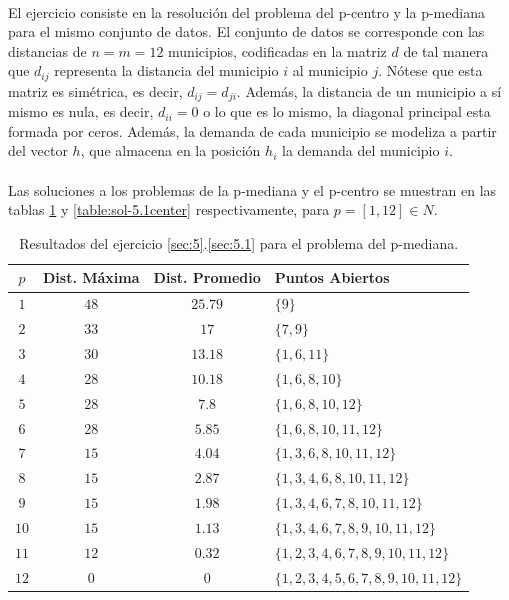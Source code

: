 \documentclass[spanish]{article}
\begin{document}
			\paragraph{}
			El ejercicio consiste en la resolución del problema del p-centro y la p-mediana para el mismo conjunto de datos. El conjunto de datos se corresponde con las distancias de $n = m = 12$ municipios, codificadas en la matriz $d$ de tal manera que $d_{ij}$ representa la distancia del municipio $i$ al municipio $j$. Nótese que esta matriz es simétrica, es decir, $d_{ij} = d_{ji}$. Además, la distancia de un municipio a sí mismo es nula, es decir, $d_{ii} = 0$ o lo que es lo mismo, la diagonal principal esta formada por ceros. Además, la demanda de cada municipio se modeliza a partir del vector $h$, que almacena en la posición $h_i$ la demanda del municipio $i$.

			\paragraph{}
			Las soluciones a los problemas de la p-mediana y el p-centro se muestran en las tablas \ref{table:sol-5.1median} y \ref{table:sol-5.1center} respectivamente, para $p = [1, 12] \in N$.

			\begin{table}[h]
				\begin{center}
					\begin{tabular}{|c || c || c || l | }
						\hline
						$p$		& Dist. Máxima 	& Dist. Promedio	& Puntos Abiertos	 \\ \hline \hline
						$1$ 	& $48$ 					& $25.79$					& $\{9\}$ \\ \hline
						$2$ 	& $33$ 					& $17$						& $\{7,9\}$ \\ \hline
						$3$ 	& $30$ 					& $13.18$					& $\{1,6,11\}$ \\ \hline
						$4$ 	& $28$ 					& $10.18$					& $\{1,6,8,10\}$ \\ \hline
						$5$ 	& $28$ 					& $7.8$						& $\{1,6,8,10,12\}$ \\ \hline
						$6$ 	& $28$ 					& $5.85$					& $\{1,6,8,10,11,12\}$ \\ \hline
						$7$ 	& $15$ 					& $4.04$					& $\{1,3,6,8,10,11,12\}$ \\ \hline
						$8$ 	& $15$ 					& $2.87$					& $\{1,3,4,6,8,10,11,12\}$ \\ \hline
						$9$ 	& $15$ 					& $1.98$					& $\{1,3,4,6,7,8,10,11,12\}$ \\ \hline
						$10$ 	& $15$ 					& $1.13$					& $\{1,3,4,6,7,8,9,10,11,12\}$ \\ \hline
						$11$ 	& $12$ 					& $0.32$					& $\{1,2,3,4,6,7,8,9,10,11,12\}$ \\ \hline
						$12$ 	& $0$ 					& $0$							& $\{1,2,3,4,5,6,7,8,9,10,11,12\}$ \\
						\hline
					\end{tabular}
				\end{center}
				\caption{Resultados del ejercicio \ref{sec:5}.\ref{sec:5.1} para el problema del p-mediana.}
				\label{table:sol-5.1median}
			\end{table}
\end{document}
